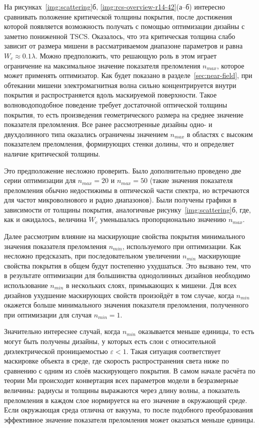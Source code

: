 На рисунках~\ref{img:scattering}б,
\ref{img:rcs-overview-r14-42}(а--б) интересно сравнивать положение
критической толщины покрытия, после достижения которой появляется
возможность получать с помощью оптимизации дизайны с заметно
пониженной TSCS.  Оказалось, что эта критическая толщина слабо зависит
от размера мишени в рассматриваемом диапазоне параметров и равна
${W_c \approx 0.1\lambda}$.  Можно предположить, что решающую роль в
этом играет ограничение на максимальное значение показателя
преломления $n_{max}$, которое может применять оптимизатор.  Как будет
показано в разделе~\ref{sec:near-field}, при обтекании мишени
электромагнитная волна сильно концентрируется внутри покрытия
и распространяется вдоль маскируемой поверхности.  Такое волноводоподобное
поведение требует достаточной оптической толщины покрытия, то есть
произведения геометрического размера на среднее значение показателя
преломления. Все ранее рассмотренные дизайны одно- и двухдолинного
типа оказались ограничены значением $n_{max}$ в областях с высоким
показателем преломления, формирующих стенки долины, что и определяет
наличие критической толщины.

Это предположение несложно проверить. Было дополнительно проведено
две серии оптимизации для $n_{max}=20$ и $n_{max}=50$ (такие значения
показателя преломления обычно недостижимы в оптической части спектра,
но встречаются для частот микроволнового и радио диапазонов).
Были получены графики в зависимости от толщины покрытия, аналогичные
рисунку~\ref{img:scattering}б, где, как и ожидалось, величина $W_c$
уменьшалась пропорционально значению $n_{max}$.

Далее рассмотрим влияние на маскирующие свойства покрытия минимального
значения показателя преломления $n_{min}$, используемого при
оптимизации.  Как несложно предсказать, при последовательном
увеличении $n_{min}$ маскирующие свойства покрытия в общем будут
постепенно ухудшаться. Это вызвано тем, что в результате оптимизации
для большинства однодолинных дизайнов необходимо использование
$n_{min}$ в нескольких слоях, примыкающих к мишени. Для всех дизайнов
ухудшение маскирующих свойств произойдёт в том случае, когда $n_{min}$
окажется больше минимального значения показателя преломления,
полученного при оптимизации для случая $n_{min}=1$. 

Значительно интереснее случай, когда $n_{min}$ оказывается меньше
единицы, то есть могут быть получены дизайны, у которых есть слои с
относительной диэлектрической проницаемостью $\varepsilon <1$.  Такая
ситуация соответствует маскировке объекта в среде, где
скорость распространения света ниже по сравнению с одним из слоёв
маскирующего покрытия.  В самом начале расчёта по теории Ми происходит
конвертация всех параметров модели в безразмерные величины: радиусы и
толщины выражаются через длину волны, а показатель преломления в
каждом слое нормируется на его значение в окружающей среде. Если
окружающая среда отлична от вакуума, то после подобного
преобразования эффективное значение показателя преломления может
оказаться меньше единицы.



